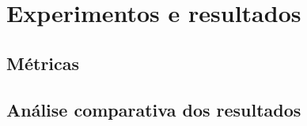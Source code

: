 \section{Experimentos e resultados}

\subsection{M\'etricas}


\subsection{An\'alise comparativa dos resultados}


